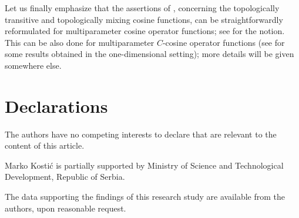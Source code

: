 \documentclass{amsart}
\theoremstyle{definition}
\theoremstyle{remark}
\numberwithin{equation}{section}
\begin{document}
Let us finally emphasize that the assertions of \cite[Theorem 1.2, Corollary 1.3, Theorem 1.4]{boni}, concerning the topologically transitive and topologically mixing cosine functions, can be straightforwardly reformulated for multiparameter cosine operator functions; see \cite{apsclcs} for the notion. This can be also done for multiparameter $C$-cosine operator functions (see \cite[Theorem 3.2.26, Theorem 3.2.44]{knjigah} for some results obtained in the one-dimensional setting); more details will be given somewhere else.

\section*{Declarations}

 The authors have no competing interests to declare that are relevant to the content of this article.\vspace{0.2cm}

Marko Kosti\'c is partially supported by Ministry
of Science and Technological Development, Republic of Serbia.\vspace{0.2cm}

 The data supporting the findings of this research study are available from
the authors, upon reasonable request.
\end{document}
